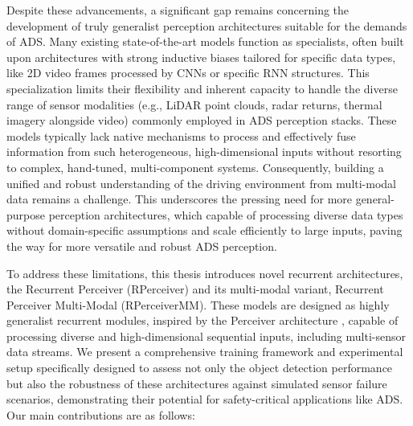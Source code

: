 
Despite these advancements, a significant gap remains concerning the development of truly generalist perception architectures suitable for the demands of ADS. Many existing state-of-the-art models function as specialists, often built upon architectures with strong inductive biases tailored for specific data types, like 2D video frames processed by CNNs or specific RNN structures. This specialization limits their flexibility and inherent capacity to handle the diverse range of sensor modalities (e.g., LiDAR point clouds, radar returns, thermal imagery alongside video) commonly employed in ADS perception stacks. These models typically lack native mechanisms to process and effectively fuse information from such heterogeneous, high-dimensional inputs without resorting to complex, hand-tuned, multi-component systems. Consequently, building a unified and robust understanding of the driving environment from multi-modal data remains a challenge. This underscores the pressing need for more general-purpose perception architectures, which capable of processing diverse data types without domain-specific assumptions and scale efficiently to large inputs, paving the way for more versatile and robust ADS perception.




To address these limitations, this thesis introduces novel recurrent architectures, the Recurrent Perceiver (RPerceiver) and its multi-modal variant, Recurrent Perceiver Multi-Modal (RPerceiverMM). These models are designed as highly generalist recurrent modules, inspired by the Perceiver architecture \cite{jaeglePerceiverGeneralPerception2021}, capable of processing diverse and high-dimensional sequential inputs, including multi-sensor data streams. We present a comprehensive training framework and experimental setup specifically designed to assess not only the object detection performance but also the robustness of these architectures against simulated sensor failure scenarios, demonstrating their potential for safety-critical applications like ADS. Our main contributions are as follows:

